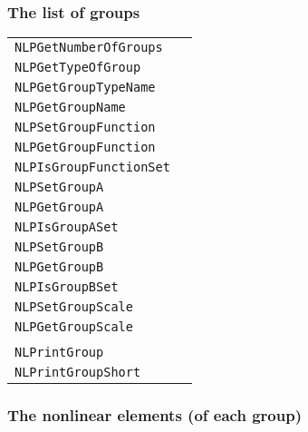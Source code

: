 \documentclass[12pt]{article}
\begin{document}
\subsubsection{The list of groups}

\begin{center}
\begin{tabular}{ll}
\tt NLPGetNumberOfGroups&\pageref{Subroutine:NLPGetNumberOfGroups}\\
\tt NLPGetTypeOfGroup&\pageref{Subroutine:NLPGetTypeOfGroup}\\
\tt NLPGetGroupTypeName&\pageref{Subroutine:NLPGetGroupTypeName}\\
\tt NLPGetGroupName&\pageref{Subroutine:NLPGetGroupName}\\
\tt NLPSetGroupFunction&\pageref{Subroutine:NLPSetGroupFunction}\\
\tt NLPGetGroupFunction&\pageref{Subroutine:NLPGetGroupFunction}\\
\tt NLPIsGroupFunctionSet&\pageref{Subroutine:NLPIsGroupFunctionSet}\\
\tt NLPSetGroupA&\pageref{Subroutine:NLPSetGroupA}\\
\tt NLPGetGroupA&\pageref{Subroutine:NLPGetGroupA}\\
\tt NLPIsGroupASet&\pageref{Subroutine:NLPIsGroupASet}\\
\tt NLPSetGroupB&\pageref{Subroutine:NLPSetGroupB}\\
\tt NLPGetGroupB&\pageref{Subroutine:NLPGetGroupB}\\
\tt NLPIsGroupBSet&\pageref{Subroutine:NLPIsGroupBSet}\\
\tt NLPSetGroupScale&\pageref{Subroutine:NLPSetGroupScale}\\
\tt NLPGetGroupScale&\pageref{Subroutine:NLPGetGroupScale}\\
\\
\tt NLPrintGroup&\pageref{Subroutine:NLPrintGroup}\\
\tt NLPrintGroupShort&\pageref{Subroutine:NLPrintGroupShort}\\
\end{tabular}
\end{center}

\subsubsection{The nonlinear elements (of each group)}
\end{document}

